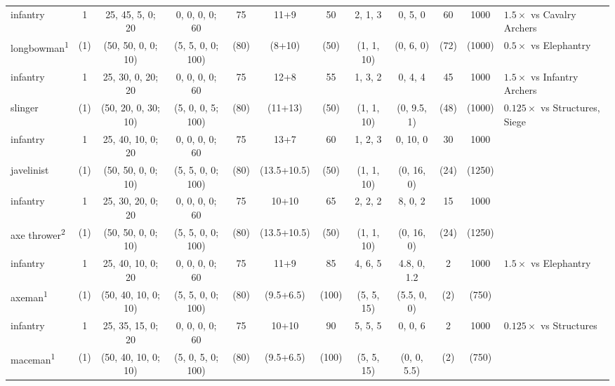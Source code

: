 \documentclass{article}
\begin{document}
\begin{landscape}
\begin{tabular}{l|ccc|cccc|ccc|l}
\hline
infantry                           &  1  &  25, 45,  5, 0; 20  &  0, 0, 0, 0;  60  &  75  &    11+9     &   50  &   2,  1,  3  &  0,  5,  0  &  60  &  1000  & $1.5\times$ vs Cavalry Archers \\
longbowman\textsuperscript{1}      & (1) & (50, 50,  0, 0; 10) & (5, 5, 0, 0; 100) & (80) &    (8+10)   &  (50) &  (1,  1, 10) & (0,  6,  0) & (72) & (1000) & $0.5\times$ vs Elephantry \\
\hline
infantry                           &  1  &  25, 30, 0, 20; 20  &  0, 0, 0, 0;  60  &  75  &    12+8     &   55  &   1,  3,  2  &  0,  4,  4  &  45  &  1000  & $1.5\times$ vs Infantry Archers\\
slinger                            & (1) & (50, 20, 0, 30; 10) & (5, 0, 0, 5; 100) & (80) &   (11+13)   &  (50) &  (1,  1, 10) & (0, 9.5, 1) & (48) & (1000) & $0.125\times$ vs Structures, Siege\\
\hline
infantry                           &  1  &  25, 40, 10, 0; 20  &  0, 0, 0, 0;  60  &  75  &    13+7     &   60  &   1,  2,  3  &  0, 10,  0  &  30  &  1000  & \\
javelinist                         & (1) & (50, 50,  0, 0; 10) & (5, 5, 0, 0; 100) & (80) & (13.5+10.5) &  (50) &  (1,  1, 10) & (0, 16,  0) & (24) & (1250) & \\
\hline
infantry                           &  1  &  25, 30, 20, 0; 20  &  0, 0, 0, 0;  60  &  75  &    10+10    &   65  &   2,  2,  2  &  8,  0,  2  &  15  &  1000  & \\
axe thrower\textsuperscript{2}     & (1) & (50, 50,  0, 0; 10) & (5, 5, 0, 0; 100) & (80) & (13.5+10.5) &  (50) &  (1,  1, 10) & (0, 16,  0) & (24) & (1250) & \\
\hline
infantry                           &  1  &  25, 40, 10, 0; 20  &  0, 0, 0, 0;  60  &  75  &    11+9     &   85  &   4,  6,  5  & 4.8, 0, 1.2 &   2  &  1000  & $1.5\times$ vs Elephantry\\
axeman\textsuperscript{1}          & (1) & (50, 40, 10, 0; 10) & (5, 5, 0, 0; 100) & (80) &  (9.5+6.5)  & (100) &  (5,  5, 15) & (5.5, 0, 0) &  (2) &  (750) & \\
\hline
infantry                           &  1  &  25, 35, 15, 0; 20  &  0, 0, 0, 0;  60  &  75  &    10+10    &   90  &   5,  5,  5  &  0,  0,  6  &   2  &  1000  & $0.125\times$ vs Structures\\
maceman\textsuperscript{1}         & (1) & (50, 40, 10, 0; 10) & (5, 0, 5, 0; 100) & (80) &  (9.5+6.5)  & (100) &  (5,  5, 15) & (0, 0, 5.5) &  (2) &  (750) & \\

\end{tabular}
\end{landscape}
\end{document}
